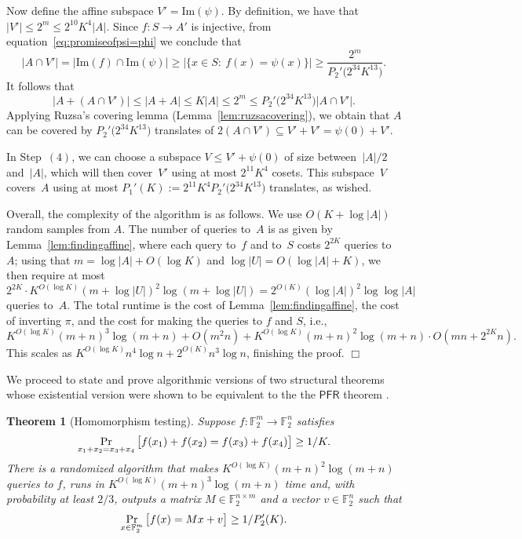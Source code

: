 \documentclass[11pt]{amsart}
\renewcommand{\Pr}{\mathop{\mbox{\rm Pr}}}
\newcommand{\F}{\mathbb{F}} %
\newcommand{\PFR}{\textsf{PFR}}
\theoremstyle{plain}
\newtheorem{theorem}{Theorem}[section]
\theoremstyle{definition}
\theoremstyle{remark}
\renewenvironment{proof}[1][]{
    	\begin{trivlist}
     	\item[\hspace{\labelsep}{\em\noindent Proof#1:\/}]}
     	{{\hfill$\Box$}
    	\end{trivlist}
  }
\begin{document}
\begin{proof}
Now define the affine subspace $V' = \mathrm{Im}(\psi)$.
By definition, we have that $|V'| \leq 2^m \leq 2^{10} K^4|A|$.
Since $f: S \to A'$ is injective, from equation~\eqref{eq:promiseofpsi=phi} we conclude that
$$|A\cap V'| = |\mathrm{Im}(f) \cap \mathrm{Im}(\psi)| \geq \big|\big\{x\in S:\: f(x) = \psi(x)\big\}\big| \geq \frac{2^m}{P_2'\big(2^{34}K^{13}\big)}.$$
It follows that
$$|A + (A\cap V')| \leq |A+A| \leq K |A| \leq 2^m \leq P_2'\big(2^{34}K^{13}\big) |A\cap V'|.$$
Applying Ruzsa's covering lemma (Lemma~\ref{lem:ruzsacovering}), we obtain that $A$ can be covered by $P_2'\big(2^{34}K^{13}\big)$ translates of $2(A\cap V') \subseteq V' + V' = \psi(0)+V'$.

In Step~$(4)$, we can choose a subspace $V \leq V' + \psi(0)$ of size between~$|A|/2$ and~$|A|$, which will then cover~$V'$ using at most $2^{11} K^4$ cosets.
This subspace~$V$ covers~$A$ using at most $P_1'(K) := 2^{11}K^4 P_2'\big(2^{34}K^{13}\big)$ translates, as wished.

Overall, the complexity of the algorithm is as follows.
We use $O(K+\log |A|)$ random samples from $A$.
The number of queries to~$A$ is as given by Lemma~\ref{lem:findingaffine}, where each query to~$f$ and to~$S$ costs $2^{2K}$ queries to~$A$;
using that $m = \log|A| + O(\log K)$ and $\log|U| = O(\log|A| + K)$, we then require at most
$$2^{2K} \cdot K^{O(\log K)} (m+\log|U|)^2 \log (m+\log|U|) = 2^{O(K)} (\log |A|)^2 \log \log |A|$$
queries to~$A$.
The total runtime is the cost of Lemma~\ref{lem:findingaffine}, the cost of inverting $\pi$, and the cost for making the queries to $f$ and $S$, i.e.,
$$
K^{O(\log K)} (m+n)^3 \log (m+n) + O(m^2 n) + K^{O(\log K)} (m+n)^2 \log (m+n) \cdot O(mn + 2^{2K}n).
$$
This scales as $K^{O(\log K)} n^4 \log n + 2^{O(K)} n^3 \log n$, finishing the proof.
\end{proof}

We proceed to state and prove algorithmic versions of two structural theorems whose existential version were shown to be equivalent to the the $\PFR$ theorem \cite{green2004finite, green2005notes}.



\begin{theorem}[Homomorphism testing]
\label{thm:algoPFR2'}
    Suppose $f: \F_2^m \to \F_2^n$ satisfies
    $$\Pr_{x_1+x_2 = x_3+x_4} \big[f(x_1)+f(x_2) = f(x_3)+f(x_4)\big] \geq 1/K.$$
    There is a randomized algorithm that makes $K^{O(\log K)} (m+n)^2 \log (m+n)$ queries to $f$, runs in $K^{O(\log K)} (m+n)^3 \log (m+n)$ time and, with probability at least $2/3$, outputs a matrix $M \in \F_2^{n\times m}$ and a vector $v\in \F_2^n$ such that
    $$\Pr_{x\in \F_2^m} \big[f(x) = Mx + v\big] \geq 1/P_2'(K).$$
\end{theorem}
\end{document}

